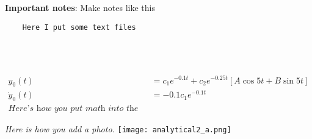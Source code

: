 \documentclass[10pt, AMS Euler]{article}
\begin{document}
\textbf{Important notes}: Make notes like this
\begin{lstlisting}
    Here I put some text files
\end{lstlisting}

\newpage
\noindent \underline{\hspace{7in}}\\

\noindent \underline{\hspace{7in}}\\
\begin{center}
    \begin{align*}
        y_0(t) &= c_1e^{-0.1 t} + c_2e^{-0.25 t}[A \cos{5t} + B \sin{5t}]\\
        \dot{y}_0(t) &= -0.1c_1e^{-0.1 t} \\
        \textit{Here's how you put math into the code.}
    \end{align*}
\end{center}
\textit{Here is how you add a photo.}
\texttt{[image: analytical2\_a.png]}
\end{document}
